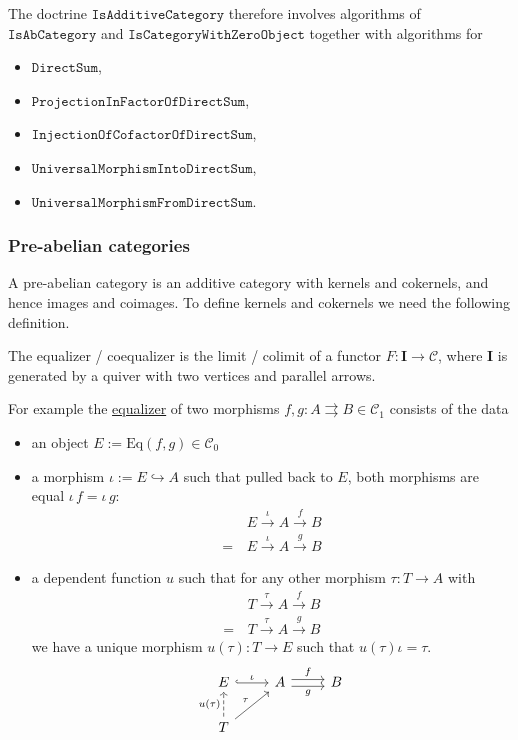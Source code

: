 \begin{doctrine}
The doctrine $\mathtt{IsAdditiveCategory}$ therefore involves algorithms of $\mathtt{IsAbCategory}$ and
$\mathtt{IsCategoryWithZeroObject}$ together with algorithms for
\begin{itemize}
 \item $\mathtt{DirectSum}$,
 \item $\mathtt{ProjectionInFactorOfDirectSum}$,
 \item $\mathtt{InjectionOfCofactorOfDirectSum}$,
 \item $\mathtt{UniversalMorphismIntoDirectSum}$,
 \item $\mathtt{UniversalMorphismFromDirectSum}$.
\end{itemize}
\end{doctrine}

\subsubsection{Pre-abelian categories}

A pre-abelian category is an additive category with kernels and cokernels, and hence images and coimages. To define
kernels and cokernels we need the following definition.

\begin{definition}
The equalizer / coequalizer is the limit / colimit of a functor $F : \mathbf{I} \rightarrow \mathcal{C}$, where $\mathbf{I}$ is generated by a
quiver with two vertices and parallel arrows.
\end{definition}

For example the \ul{equalizer} of two morphisms $f, g : A \rightrightarrows B \in \mathcal{C}_{1}$
consists of the data
\begin{itemize}
\item an object $E := \mathrm{Eq}(f,g) \in \mathcal{C}_{0}$
\item a morphism $\iota := E \hookrightarrow A$ such that pulled back to $E$, both morphisms are equal $\iota\,f = \iota\,g$:
\begin{align*}
&E \xrightarrow{\iota} A \xrightarrow{f} B \\
=\, &E \xrightarrow{\iota} A \xrightarrow{g} B
\end{align*}
\item a dependent function $u$ such that for any other morphism $\tau : T \rightarrow A$ with
\begin{align*}
&T \xrightarrow{\tau} A \xrightarrow{f} B \\
=\, &T \xrightarrow{\tau} A \xrightarrow{g} B
\end{align*}
we have a unique morphism $u( \tau ) : T \rightarrow E$ such that $u( \tau ) \iota = \tau$.
\[
\begin{tikzcd}
E \arrow[r, "\iota", hook]                              & A \arrow[r, "f", shift left] \arrow[r, "g"', shift right] & B \\
T \arrow[ru, "\tau"] \arrow[u, "u(\tau)", dashed] &                                                           &  
\end{tikzcd}
\]
\end{itemize}

